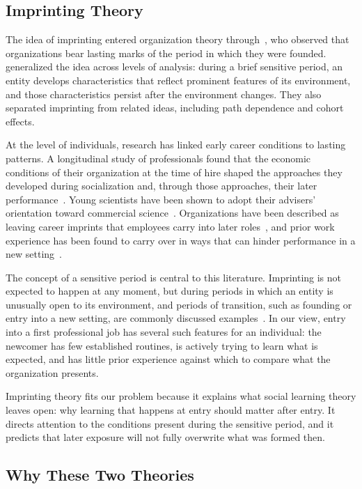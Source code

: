 \documentclass[12pt,a4paper]{article}
\theoremstyle{definition}
\begin{document}
\subsection{Imprinting Theory}

The idea of imprinting entered organization theory through~\citet{stinchcombe1965social}, who observed that organizations bear lasting marks of the period in which they were founded. \citet{marquis2013imprinting} generalized the idea across levels of analysis: during a brief sensitive period, an entity develops characteristics that reflect prominent features of its environment, and those characteristics persist after the environment changes. They also separated imprinting from related ideas, including path dependence and cohort effects.

At the level of individuals, research has linked early career conditions to lasting patterns. A longitudinal study of professionals found that the economic conditions of their organization at the time of hire shaped the approaches they developed during socialization and, through those approaches, their later performance~\citep{tilcsik2014imprint}. Young scientists have been shown to adopt their advisers' orientation toward commercial science~\citep{azoulay2017social}. Organizations have been described as leaving career imprints that employees carry into later roles~\citep{higgins2005career}, and prior work experience has been found to carry over in ways that can hinder performance in a new setting~\citep{dokko2009unpacking}.

The concept of a sensitive period is central to this literature. Imprinting is not expected to happen at any moment, but during periods in which an entity is unusually open to its environment, and periods of transition, such as founding or entry into a new setting, are commonly discussed examples~\citep{marquis2013imprinting}. In our view, entry into a first professional job has several such features for an individual: the newcomer has few established routines, is actively trying to learn what is expected, and has little prior experience against which to compare what the organization presents.

Imprinting theory fits our problem because it explains what social learning theory leaves open: why learning that happens at entry should matter after entry. It directs attention to the conditions present during the sensitive period, and it predicts that later exposure will not fully overwrite what was formed then.

\subsection{Why These Two Theories}
\end{document}
